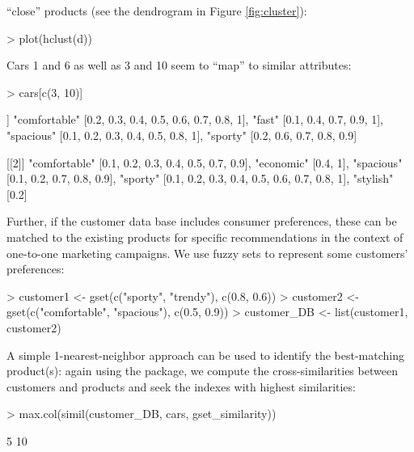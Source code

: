\documentclass[article]{jss}
\newcommand{\dQuote}[1]{``{#1}''}
\begin{document}
\dQuote{close} products (see the dendrogram in Figure \ref{fig:cluster}):
\begin{Schunk}
\begin{Sinput}
> plot(hclust(d))
\end{Sinput}
\end{Schunk}
Cars 1 and 6 as well as 3 and 10 seem to \dQuote{map} to similar attributes:
\begin{Schunk}
\begin{Sinput}
> cars[c(3, 10)]
\end{Sinput}
\begin{Soutput}
[[1]]
{"comfortable" [{0.2, 0.3, 0.4, 0.5, 0.6, 0.7, 0.8, 1}], "fast" [{0.1,
 0.4, 0.7, 0.9, 1}], "spacious" [{0.1, 0.2, 0.3, 0.4, 0.5, 0.8, 1}],
 "sporty" [{0.2, 0.6, 0.7, 0.8, 0.9}]}

[[2]]
{"comfortable" [{0.1, 0.2, 0.3, 0.4, 0.5, 0.7, 0.9}], "economic" [{0.4,
 1}], "spacious" [{0.1, 0.2, 0.7, 0.8, 0.9}], "sporty" [{0.1, 0.2, 0.3,
 0.4, 0.5, 0.6, 0.7, 0.8, 1}], "stylish" [{0.2}]}
\end{Soutput}
\end{Schunk}
Further, if the customer data base includes consumer preferences, these can be
matched to the existing products for specific recommendations in the
context of one-to-one marketing campaigns. We use fuzzy sets to
represent some customers' preferences:
\begin{Schunk}
\begin{Sinput}
> customer1 <- gset(c("sporty", "trendy"), c(0.8, 0.6))
> customer2 <- gset(c("comfortable", "spacious"), c(0.5, 0.9))
> customer_DB <- list(customer1, customer2)
\end{Sinput}
\end{Schunk}
A simple 1-nearest-neighbor approach can be used to identify the
best-matching product(s): again using the  package, we
compute the cross-similarities between customers and products
and seek the indexes with highest similarities:
\begin{Schunk}
\begin{Sinput}
> max.col(simil(customer_DB, cars, gset_similarity))
\end{Sinput}
\begin{Soutput}
[1]  5 10
\end{Soutput}
\end{Schunk}
\end{document}
